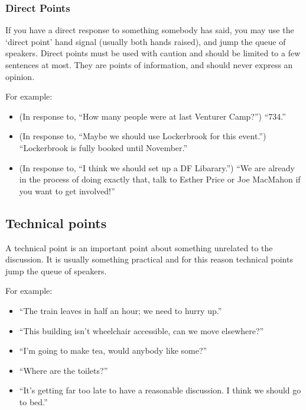 \documentclass[a4paper, 12pt]{article} %
\begin{document}
\subsubsection{Direct Points}
If you have a direct response to something somebody has said, you may use the `direct point' hand signal (usually both hands raised), and jump the queue of speakers. Direct points must be used with caution and should be limited to a few sentences at most. They are points of information, and should never express an opinion.

For example:
\begin{itemize}
\item (In response to, ``How many people were at last Venturer Camp?'') ``734.''
\item (In response to, ``Maybe we should use Lockerbrook for this event.'') ``Lockerbrook is fully booked until November.''
\item (In response to, ``I think we should set up a DF Libarary.'') ``We are already in the process of doing exactly that, talk to Esther Price or Joe MacMahon if you want to get involved!''
\end{itemize}

\subsection{Technical points}
A technical point is an important point about something unrelated to the discussion.  It is usually something practical and for this reason technical points jump the queue of speakers.

For example:
\begin{itemize}
\item ``The train leaves in half an hour; we need to hurry up.''
\item ``This building isn't wheelchair accessible, can we move elsewhere?''
\item ``I'm going to make tea, would anybody like some?''
\item ``Where are the toilets?''
\item ``It's getting far too late to have a reasonable discussion.  I think we should go to bed.''
\end{itemize}
\end{document}

